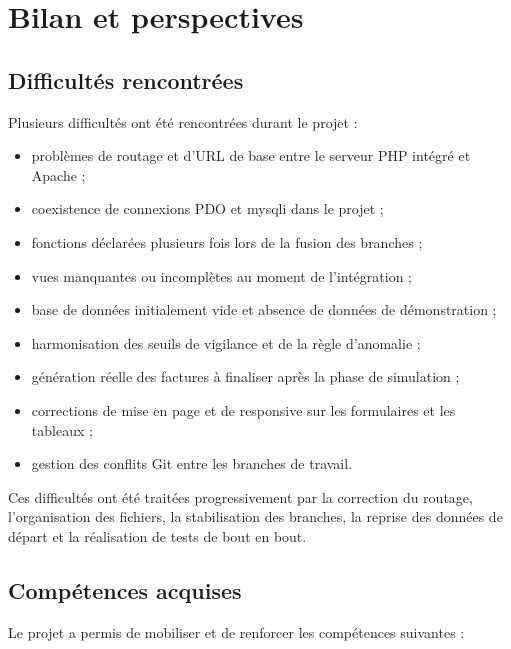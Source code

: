 \section{Bilan et perspectives}

\subsection{Difficultés rencontrées}

Plusieurs difficultés ont été rencontrées durant le projet :

\begin{itemize}[leftmargin=*]
  \item problèmes de routage et d'URL de base entre le serveur PHP intégré et Apache ;
  \item coexistence de connexions PDO et mysqli dans le projet ;
  \item fonctions déclarées plusieurs fois lors de la fusion des branches ;
  \item vues manquantes ou incomplètes au moment de l'intégration ;
  \item base de données initialement vide et absence de données de démonstration ;
  \item harmonisation des seuils de vigilance et de la règle d'anomalie ;
  \item génération réelle des factures à finaliser après la phase de simulation ;
  \item corrections de mise en page et de responsive sur les formulaires et les tableaux ;
  \item gestion des conflits Git entre les branches de travail.
\end{itemize}

Ces difficultés ont été traitées progressivement par la correction du routage, l'organisation des fichiers, la stabilisation des branches, la reprise des données de départ et la réalisation de tests de bout en bout.

\subsection{Compétences acquises}

Le projet a permis de mobiliser et de renforcer les compétences suivantes :

